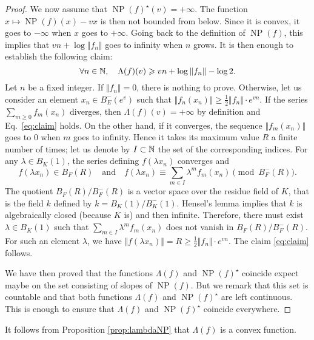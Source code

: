 \documentclass{lms}
\DeclareMathOperator{\NP}{NP}
\begin{document}
\begin{proof}
We now assume that $\NP(f)^\star(v) = +\infty$. The function $x \mapsto 
\NP(f)(x) - vx$ is then not bounded from below. Since it is convex, it 
goes to $-\infty$ when $x$ goes to $+\infty$. Going back to the 
definition of $\NP(f)$, this implies that $v n + \log \Vert f_n \Vert$
goes to infinity when $n$ grows. It is then enough to establish the
following claim:
\begin{equation}
\label{eq:claim}
\forall n \in \mathbb N, \quad 
\Lambda(f)(v) \geqslant v n + \log \Vert f_n \Vert - \log 2.
\end{equation}
Let $n$ be a fixed integer. If $\Vert f_n 
\Vert = 0$, there is nothing to prove. Otherwise, let us consider an
element $x_n \in B^-_E(e^v)$ such that $\Vert f_n(x_n) \Vert \geq \frac 
1 2 \Vert f_n \Vert \cdot e^{vn}$. If the series $\sum_{m \geq 0} 
f_m(x_n)$ diverges, then $\Lambda(f)(v) = +\infty$ by definition and 
Eq.~\eqref{eq:claim} holds. On the other hand, if it converges, the
sequence $\Vert f_m(x_n) \Vert$ goes to $0$ when $m$ goes to infinity.
Hence it takes its maximum value $R$ a finite number of times; let us 
denote by $I \subset \mathbb N$ the set of the corresponding indices. For any
$\lambda \in B_K(1)$, the series defining $f(\lambda x_n)$ converges 
and
$$f(\lambda x_n) \in B_F(R)
\quad \text{and} \quad
f(\lambda x_n) \equiv \sum_{m \in I} \lambda^m f_m(x_n)
\pmod {B^-_F(R)}.$$
The quotient $B_F(R) / B^-_F(R)$ is a vector space over the residue
field of $K$, that is the field $k$ defined by $k = B_K(1)/B^-_K(1)$.
Hensel's lemma implies that $k$ is algebraically closed (because $K$ 
is) and then infinite. Therefore, there must exist $\lambda \in 
B_K(1)$ such that $\sum_{m \in I} \lambda^m f_m(x_n)$ does not vanish
in $B_F(R) / B^-_F(R)$. For such an element $\lambda$, we have $\Vert 
f(\lambda x_n) \Vert = R \geq \frac 1 2 \Vert f_n \Vert \cdot e^{vn}$. 
The claim \eqref{eq:claim} follows.

\smallskip

We have then proved that the functions $\Lambda(f)$ and $\NP(f)^\star$ 
coincide expect maybe on the set consisting of slopes of $\NP(f)$. But 
we remark that this set is countable and that both functions $\Lambda 
(f)$ and $\NP(f)^\star$ are left continuous. This is enough to ensure 
that $\Lambda (f)$ and $\NP(f)^\star$ coincide everywhere.
\end{proof}

\begin{rem}
It follows from Proposition \ref{prop:lambdaNP} that $\Lambda(f)$ is a
convex function.
\end{rem}
\end{document}
